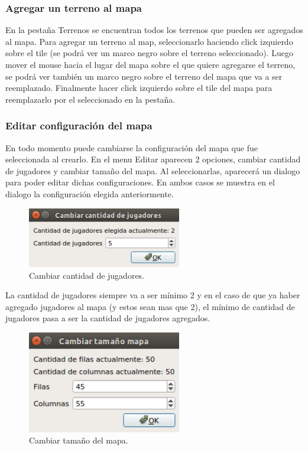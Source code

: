 \documentclass[titlepage,a4paper,12pt]{article}
\begin{document}
\subsubsection{Agregar un terreno al mapa}

En la pestaña Terrenos se encuentran todos los terrenos que pueden ser agregados al mapa. Para agregar un terreno al map, seleccionarlo haciendo click izquierdo sobre el tile (se podrá ver un marco negro sobre el terreno seleccionado). Luego mover el mouse hacia el lugar del mapa sobre el que quiere agregarse el terreno, se podrá ver también un marco negro sobre el terreno del mapa que va a ser reemplazado. Finalmente hacer click izquierdo sobre el tile del mapa para reemplazarlo por el seleccionado en la pestaña.

\subsubsection{Editar configuración del mapa}

En todo momento puede cambiarse la configuración del mapa que fue seleccionada al crearlo. En el menu Editar aparecen 2 opciones, cambiar cantidad de jugadores y cambiar tamaño del mapa. Al seleccionarlas, aparecerá un dialogo para poder editar dichas configuraciones. En ambos casos se muestra en el dialogo la configuración elegida anteriormente.\\

\begin{figure}[H]
	\centering
	\includegraphics[width=0.6\textwidth]{../imagenes/cambiar_jugadores.png}
	\caption{\label{fig:menu_editor} Cambiar cantidad de jugadores.}
\end{figure}

La cantidad de jugadores siempre va a ser mínimo 2 y en el caso de que ya haber agregado jugadores al mapa (y estos sean mas que 2), el mínimo de cantidad de jugadores pasa a ser la cantidad de jugadores agregados.\\

\begin{figure}[H]
	\centering
	\includegraphics[width=0.6\textwidth]{../imagenes/cambiar_tamanio.png}
	\caption{\label{fig:menu_editor} Cambiar tamaño del mapa.}
\end{figure}
\end{document}
